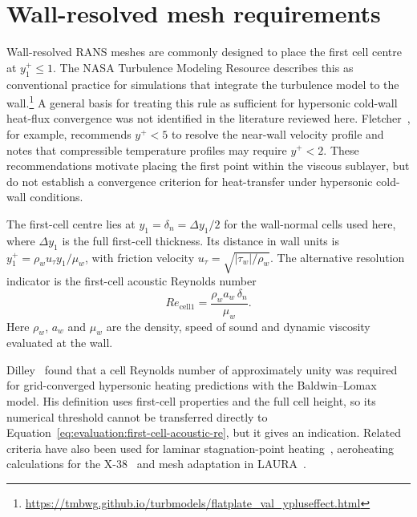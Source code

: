 \section{Wall-resolved mesh requirements}
\label{sec:evaluation:mesh-families-yplus}

Wall-resolved RANS meshes are commonly designed to place the first cell centre at \(y_1^+\le1\). The NASA Turbulence Modeling Resource describes this as conventional practice for simulations that integrate the turbulence model to the wall.\footnote{\url{https://tmbwg.github.io/turbmodels/flatplate_val_ypluseffect.html}} A general basis for treating this rule as sufficient for hypersonic cold-wall heat-flux convergence was not identified in the literature reviewed here. Fletcher~\cite[p.~401]{fletcher2012computational}, for example, recommends \(y^+<5\) to resolve the near-wall velocity profile and notes that compressible temperature profiles may require \(y^+<2\). These recommendations motivate placing the first point within the viscous sublayer, but do not establish a convergence criterion for heat-transfer under hypersonic cold-wall conditions.
\par\medskip

The first-cell centre lies at \(y_1=\delta_n=\Delta y_1/2\) for the
wall-normal cells used here, where \(\Delta y_1\) is the full first-cell
thickness. Its distance in wall units is \(y_1^+=\rho_w u_\tau y_1/\mu_w\),
with friction velocity \(u_\tau=\sqrt{|\tau_w|/\rho_w}\).
The alternative resolution indicator is the first-cell acoustic Reynolds number
\begin{equation}
    Re_{\mathrm{cell1}}=\frac{\rho_w a_w\,\delta_n}{\mu_w}.
    \label{eq:evaluation:first-cell-acoustic-re}
\end{equation}
Here \(\rho_w\), \(a_w\) and \(\mu_w\) are the density, speed of sound and
dynamic viscosity evaluated at the wall.

Dilley~\cite{dilley2001evaluation} found that a cell Reynolds number of approximately unity was required for grid-converged hypersonic heating predictions with the Baldwin--Lomax model. His definition uses first-cell properties and the full cell height, so its numerical threshold cannot be transferred directly to Equation~\eqref{eq:evaluation:first-cell-acoustic-re}, but it gives an indication. Related criteria have also been used for laminar stagnation-point heating~\cite{papadopoulos1999current}, aeroheating calculations for the X-38~\cite{loomis2004aeroheating} and mesh adaptation in LAURA~\cite{Thompson2024LAURA}.
\par\medskip

